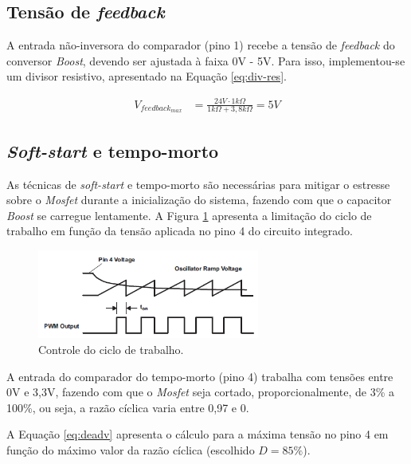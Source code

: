 \documentclass[a4paper]{article}
\begin{document}
{\subsection{Tensão de \emph{feedback}}

A entrada não-inversora do comparador (pino 1) recebe a tensão de \emph{feedback} do conversor \emph{Boost}, devendo ser ajustada à faixa 0V - 5V. Para isso, implementou-se um divisor resistivo, apresentado na Equação \ref{eq:div-res}.

\begin{equation}
\label{eq:div-res}
\begin{split}
V_{feedback_{max}} & = \frac{24V \cdot 1k\Omega}{1k\Omega + 3,8k\Omega}  = 5V
\end{split}
\end{equation}

\subsection{\emph{Soft-start} e tempo-morto}

As técnicas de \emph{soft-start} e tempo-morto são necessárias para mitigar o estresse sobre o \emph{Mosfet} durante a inicialização do sistema, fazendo com que o capacitor \emph{Boost} se carregue lentamente. A Figura \ref{fig:soft-start} apresenta a limitação do ciclo de trabalho em função da tensão aplicada no pino 4 do circuito integrado.

\begin{figure}[H]
	\centering
	\includegraphics[width=0.65\textwidth]{soft-start.PNG}
	\caption{Controle do ciclo de trabalho.}
	\label{fig:soft-start}
\end{figure}

A entrada do comparador do tempo-morto (pino 4) trabalha com tensões entre 0V e 3,3V, fazendo com que o \emph{Mosfet} seja cortado, proporcionalmente, de 3\% a 100\%, ou seja, a razão cíclica varia entre 0,97 e 0.

A Equação \ref{eq:deadv} apresenta o cálculo para a máxima tensão no pino 4 em função do máximo valor da razão cíclica (escolhido $D = 85\%$).

}
\end{document}
